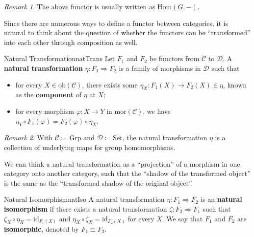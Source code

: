 \documentclass[math]{amznotes}
\theoremstyle{remark}
\newtheorem*{remark}{Remark}
\newcommand{\0}{\mathbf{0}}
\newcommand{\1}{\mathbf{1}}
\begin{document}
\begin{notebox}
    \begin{remark}
        The above functor is usually written as $\mathrm{Hom}\left(G, -\right)$.
    \end{remark}
\end{notebox}
Since there are numerous ways to define a functor between categories, it is natural to think about the question of whether the functors can be ``transformed'' into each other through composition as well.
\begin{dfnbox}{Natural Transformation}{natTrans}
    Let $F_1$ and $F_2$ be functors from $\mathcal{C}$ to $\mathcal{D}$. A {\color{red} \textbf{natural transformation}} $\eta \colon F_1 \Rightarrow F_2$ is a family of morphisms in $\mathcal{D}$ such that 
    \begin{itemize}
        \item for every $X \in \mathrm{ob}\left(\mathcal{C}\right)$, there exists some $\eta_X \colon F_1\left(X\right) \to F_2\left(X\right) \in \eta$, known as the {\color{red} \textbf{component}} of $\eta$ at $X$;
        \item for every morphism $\varphi \colon X \to Y$ in $\mathrm{mor}\left(\mathcal{C}\right)$, we have $\eta_Y \circ F_1\left(\varphi\right) = F_2\left(\varphi\right) \circ \eta_X$.
    \end{itemize} 
\end{dfnbox}
\begin{notebox}
    \begin{remark}
        With $\mathcal{C} \coloneqq \mathrm{Grp}$ and $\mathcal{D} \coloneqq \mathrm{Set}$, the natural transformation $\eta$ is a collection of underlying maps for group homomorphisms.
    \end{remark}
\end{notebox}
We can think a natural transformation as a ``projection'' of a morphism in one category onto another category, such that the ``shadow of the transformed object'' is the same as the ``transformed shadow of the original object''.
\begin{dfnbox}{Natural Isomorphism}{natIso}
    A natural transformation $\eta \colon F_1 \Rightarrow F_2$ is an {\color{red} \textbf{natural isomorphism}} if there exists a natural transformation $\zeta \colon F_2 \Rightarrow F_1$ such that $\zeta_X \circ \eta_X = \mathrm{id}_{F_1\left(X\right)}$ and $\eta_X \circ \zeta_X = \mathrm{id}_{F_2\left(X\right)}$ for every $X$. We say that $F_1$ and $F_2$ are {\color{red} \textbf{isomorphic}}, denoted by $F_1 \cong F_2$.
\end{dfnbox}
\end{document}
